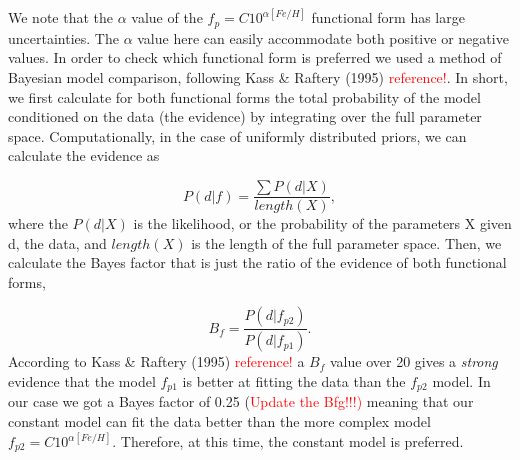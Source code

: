 \documentclass[structabstract]{aa}
\begin{document}
\begin{table}[h]
\centering
\caption{Parameters of the two bayesian models. \textcolor{red}{To be updated!}}
\label{bayes}
\begin{center}
\end{center}
\end{table}

We note that the $\alpha$ value of the $f_{p} = C10^{\alpha [Fe/H]}$ functional form has large uncertainties. The $\alpha$ value here can easily accommodate both positive or negative values. In order to check which functional form is preferred we used a method of Bayesian model comparison, following Kass \& Raftery (1995) \textcolor{red}{reference!}. In short, we first calculate for both functional forms the total probability of the model conditioned on the data (the evidence) by integrating over the full parameter space. Computationally, in the case of uniformly distributed priors, we can calculate the evidence as  

\begin{equation}
P(d|f) = \frac{\sum{P(d|X)}}{length(X)},
\end{equation}
where the $P(d|X)$ is the likelihood, or the probability of the parameters X given d, the data, and $length(X)$ is the length of the full parameter space. Then, we calculate the Bayes factor that is just the ratio of the evidence of both functional forms, 

\begin{equation}
B_{f} = \frac{P(d|f_{p2})}{P(d|f_{p1})}.
\end{equation}
According to Kass \& Raftery (1995) \textcolor{red}{reference!} a $B_{f}$ value over 20 gives a \textit{strong} evidence that the model $f_{p1}$ is better at fitting the data than the $f_{p2}$ model. In our case we got a Bayes factor of 0.25 (\textcolor{red}{Update the Bfg!!!)} meaning that our constant model can fit the data better than the more complex model $f_{p2} = C10^{\alpha[Fe/H]}$. Therefore, at this time, the constant model is preferred.
\end{document}
